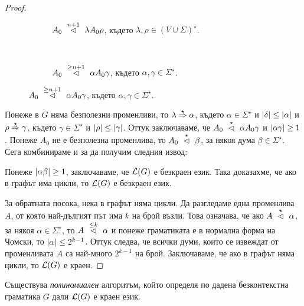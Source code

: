 \begin{proof}
\begin{figure}[H]
\begin{subfigure}[t]{0.5\textwidth}
    \caption{$A_0 \yield{n+1} \lambda A_0 \rho$, където $\lambda, \rho \in (V\cup\Sigma)^\star$.}
    \end{subfigure}
    ~ 
    \begin{subfigure}[t]{0.5\textwidth}
      \centering
      \caption{$A_0 \yield{\geq n+1}\alpha A_0\gamma$, където $\alpha,\gamma \in \Sigma^\star$.}
    \end{subfigure}
  \end{figure}

  Понеже в $G$ няма безполезни променливи, то $\lambda \derive{\star} \alpha$, където $\alpha \in \Sigma^\star$ и $\abs{\delta} \leq \abs{\alpha}$ и $\rho \derive{\star} \gamma$,
  където $\gamma \in \Sigma^\star$ и $\abs{\rho} \leq \abs{\gamma}$.
  Оттук заключаваме, че $A_0 \yield{\star} \alpha A_0 \gamma$ и $\abs{\alpha\gamma} \geq 1$.
  Понеже $A_0$ не е безполезна променлива, то $A_0 \yield{\star} \beta$, за някоя дума $\beta \in \Sigma^\star$.
  Сега комбинираме  и  за да получим следния извод:
  \begin{prooftree}
  \end{prooftree}
  Понеже $\abs{\alpha\beta} \geq 1$, заключаваме, че $\L(G)$ е безкраен език.
  Така доказахме, че ако в графът има цикли, то $\L(G)$ е безкраен език.
  
  За обратната посока, нека в графът няма цикли.
  Да разгледаме една променлива $A$, от която най-дългият път има $k$ на брой възли.
  Това означава, че ако $A \yield{\star} \alpha$, за някоя $\alpha \in \Sigma^\star$,
  то $A \yield{\leq k} \alpha$ и понеже граматиката е в нормална форма на Чомски,
  то $\abs{\alpha} \leq 2^{k-1}$.
  Оттук следва, че всички думи, които се извеждат от променливата $A$ са най-много $2^{k-1}$ на брой.
  Заключаваме, че ако в графът няма цикли, то $\L(G)$ е краен.
\end{proof}

\begin{theorem}
  Съществува \emph{полиномиален} алгоритъм, който определя по дадена безконтекстна граматика $G$ дали $\L(G)$ е краен език.
\end{theorem}

